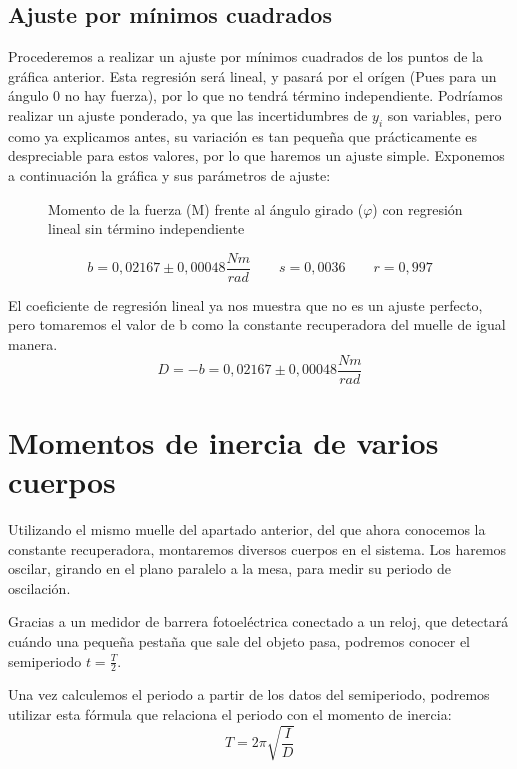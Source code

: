 \documentclass[12pt, a4paper, titlepage]{article}
\begin{document}
  \newpage
  \subsection{Ajuste por mínimos cuadrados}

  Procederemos a realizar un ajuste por mínimos cuadrados de los puntos de la gráfica anterior. Esta regresión será lineal, y pasará por el orígen (Pues para un ángulo 0 no hay fuerza), por lo que no tendrá término independiente. Podríamos realizar un ajuste ponderado, ya que las incertidumbres de $y_i$ son variables, pero como ya explicamos antes, su variación es tan pequeña que prácticamente es despreciable para estos valores, por lo que haremos un ajuste simple. Exponemos a continuación la gráfica y sus parámetros de ajuste:

  \begin{figure}[H]
    \hspace{3.2em} 
    \caption{Momento de la fuerza (M) frente al ángulo girado ($\varphi$) con regresión lineal sin término independiente}
  \end{figure}
  \begin{equation*}
    b = 0,02167 \pm 0,00048 \frac{Nm}{rad} \qquad s = 0,0036 \qquad r= 0,997
  \end{equation*}

  El coeficiente de regresión lineal ya nos muestra que no es un ajuste perfecto, pero tomaremos el valor de b como la constante recuperadora del muelle de igual manera.
  \begin{equation*}
    D = -b = 0,02167 \pm 0,00048 \frac{Nm}{rad}
  \end{equation*}


  \newpage
  \section{Momentos de inercia de varios cuerpos}

  Utilizando el mismo muelle del apartado anterior, del que ahora conocemos la constante recuperadora, montaremos diversos cuerpos en el sistema. Los haremos oscilar, girando en el plano paralelo a la mesa, para medir su periodo de oscilación.

  Gracias a un medidor de barrera fotoeléctrica conectado a un reloj, que detectará cuándo una pequeña pestaña que sale del objeto pasa, podremos conocer el semiperiodo $t = \frac{T}{2}$.

  Una vez calculemos el periodo a partir de los datos del semiperiodo, podremos utilizar esta fórmula que relaciona el periodo con el momento de inercia:
  \begin{equation}
    T = 2 \pi \sqrt{\frac{I}{D}} \label{ec:periodoinercia}
  \end{equation}
\end{document}
